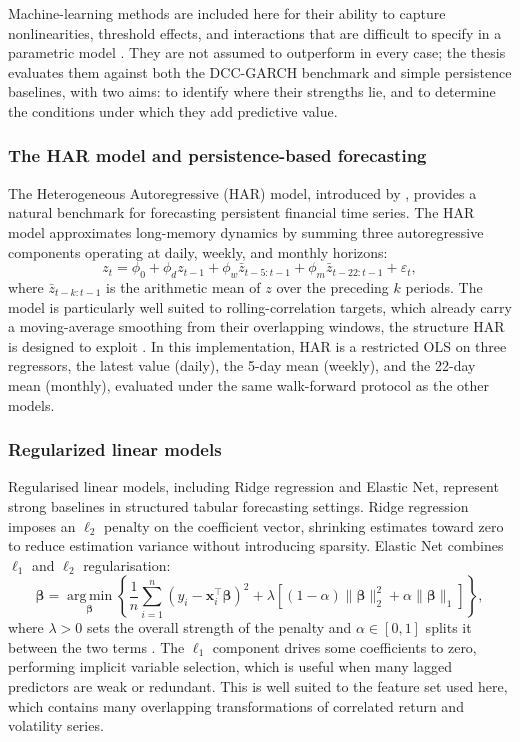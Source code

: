 Machine-learning methods are included here for their ability to capture nonlinearities, threshold effects, and interactions that are difficult to specify in a parametric model \cite{gu2020empirical}. They are not assumed to outperform in every case; the thesis evaluates them against both the DCC-GARCH benchmark and simple persistence baselines, with two aims: to identify where their strengths lie, and to determine the conditions under which they add predictive value.

\subsubsection{The HAR model and persistence-based forecasting}

The Heterogeneous Autoregressive (HAR) model, introduced by \textcite{corsi2009har}, provides a natural benchmark for forecasting persistent financial time series. The HAR model approximates long-memory dynamics by summing three autoregressive components operating at daily, weekly, and monthly horizons:
\begin{equation}
    z_t = \phi_0 + \phi_d z_{t-1} + \phi_w \bar{z}_{t-5:t-1}
          + \phi_m \bar{z}_{t-22:t-1} + \varepsilon_t,
\end{equation}
where $\bar{z}_{t-k:t-1}$ is the arithmetic mean of $z$ over the preceding $k$ periods. The model is particularly well suited to rolling-correlation targets, which already carry a moving-average smoothing from their overlapping windows, the structure HAR is designed to exploit \cite{andersen2003realized}. In this implementation, HAR is a restricted OLS on three regressors, the latest value (daily), the 5-day mean (weekly), and the 22-day mean (monthly), evaluated under the same walk-forward protocol as the other models.

\subsubsection{Regularized linear models}

Regularised linear models, including Ridge regression and Elastic Net, represent strong baselines in structured tabular forecasting settings. Ridge regression imposes an $\ell_2$ penalty on the coefficient vector, shrinking estimates toward zero to reduce estimation variance without introducing sparsity. Elastic Net combines $\ell_1$ and $\ell_2$ regularisation:
\begin{equation}
    \hat{\boldsymbol{\beta}} = \operatorname*{arg\,min}_{\boldsymbol{\beta}} \left\{
        \frac{1}{n}\sum_{i=1}^{n}(y_i - \mathbf{x}_i^{\top}\boldsymbol{\beta})^2
        + \lambda \left[(1-\alpha)\|\boldsymbol{\beta}\|_2^2 + \alpha\|\boldsymbol{\beta}\|_1\right]
    \right\},
\end{equation}
where $\lambda > 0$ sets the overall strength of the penalty and $\alpha \in [0,1]$ splits it between the two terms \cite{zou2005}. The $\ell_1$ component drives some coefficients to zero, performing implicit variable selection, which is useful when many lagged predictors are weak or redundant. This is well suited to the feature set used here, which contains many overlapping transformations of correlated return and volatility series.

